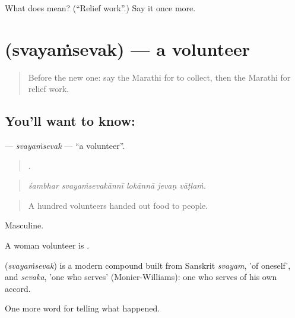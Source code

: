 \begin{tcolorbox}[breakable,colback=teal!4,colframe=teal!35!black,title={Before you move on}]
What does  mean? (\textquotedblleft{}Relief work\textquotedblright{}.) Say it once more.
\end{tcolorbox}
\section[\texorpdfstring{\mr{स्वयंसेवक} (svayaṁsevak)}{स्वयंसेवक (svayaṁsevak)}]{ (svayaṁsevak) — a volunteer}

\label{lesson:MR-C294-svayamsevak}



\begin{quote}
Before the new one: say the Marathi for to collect, then the Marathi for relief work.
\end{quote}

\subsection*{You'll want to know: }
\textbf{} — \emph{svayaṁsevak} — \textquotedblleft{}a volunteer\textquotedblright{}.

\begin{quote}
    .
\end{quote}

\begin{quote}
\emph{śambhar svayaṁsevakānnī lokānnā jevaṇ vāṭlaṁ.}
\end{quote}

\begin{quote}
A hundred volunteers handed out food to people.
\end{quote}

Masculine.

A woman volunteer is .

\begin{cousinweb}
\textbf{} (\emph{svayaṁsevak}) is a modern compound built from Sanskrit \emph{svayam}, 'of oneself', and \emph{sevaka}, 'one who serves' (Monier-Williams): one who serves of his own accord.
\end{cousinweb}

\begin{grammarlens}[title={What you've built}]
One more word for telling what happened.
\end{grammarlens}

